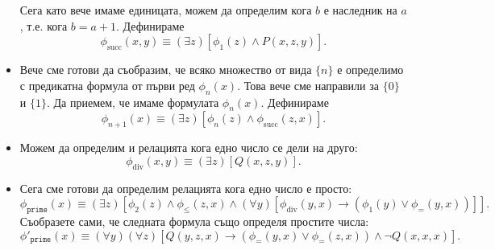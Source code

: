 \begin{example}
\begin{itemize}
    Сега като вече имаме единицата, можем да определим кога $b$ е наследник на $a$, т.е. кога $b = a + 1$.
    Дефинираме
    \[\phi_{\text{succ}}(x,y) \equiv (\exists z)[\phi_1(z) \land P(x,z,y)].\]
  \item
    Вече сме готови да съобразим, че всяко множество от вида $\{n\}$
    е определимо с предикатна формула от първи ред $\phi_n(x)$.
    Това вече сме направили за $\{0\}$ и $\{1\}$.
    Да приемем, че имаме формулата $\phi_n(x)$. Дефинираме
    \[\phi_{n+1}(x) \equiv (\exists z)[\phi_n(z) \land \phi_{\text{succ}}(z,x)].\]
  \item
    Можем да определим и релацията кога едно число се дели на друго:
    \[\phi_{\text{div}}(x,y) \equiv (\exists z)[Q(x,z,y)].\]
  \item
    Сега сме готови да определим релацията кога едно число е просто:
    \[\phi_{\texttt{prime}}(x) \equiv (\exists z)[\phi_2(z) \land \phi_{\leq}(z,x) \land (\forall y)[\phi_{\text{div}}(y,x) \to (\phi_1(y) \lor
      \phi_{=}(y,x))]].\]
    Съобразете сами, че следната формула също определя простите числа:
    \[\phi'_{\texttt{prime}}(x) \equiv (\forall y)(\forall z)[Q(y,z,x) \to (\phi_{=}(y,x) \lor \phi_{=}(z,x)) \land \neg Q(x,x,x)].\]
  \end{itemize}
\end{example}

